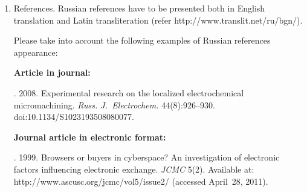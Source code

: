 {\begin{enumerate}[1.]
\begin{itemize}




\item abstract (not less than 100 words) both in Russian and in English. Abstract is a short
summary of the article that can be published separately. The abstract is the
main source of information on the article and it could be included in leading information
systems and data bases. The abstract in English has to be an original text and should
not be an exact translation of the Russian one. Good English is required.
In abstracts, avoid references and formulae;\\[-13.5pt]
\item indexing is performed on the basis of keywords. The use of keywords from the
internationally accepted thematic Thesauri is recommended.



Important! Keywords must not be sentences;
\item Acknowledgments.
\end{itemize}

\item References. Russian references have to be presented both in English translation and Latin
transliteration (refer {\sf http://www.translit.net/ru/bgn/}).

Please take into account the following examples of Russian references appearance:

\noindent
\textbf{Article in journal:}

. 2008. Experimental research on the localized electrochemical
micromachining.
\textit{Russ. J.~Electrochem.}  44(8):926--930. {\sf doi:10.1134/S1023193508080077}.


\noindent
\textbf{Journal article in electronic format:}

. 1999. Browsers or buyers in
cyberspace? An
investigation of electronic factors influencing electronic exchange. \textit{JCMC}
5(2). Available at: {\sf http://www.ascusc.org/jcmc/vol5/issue2/} (accessed April~28, 2011).





\end{enumerate}}

